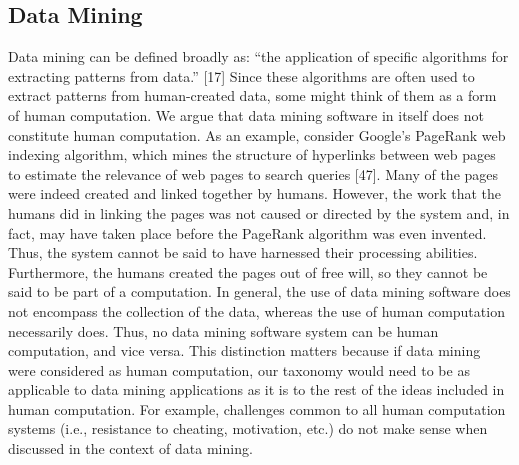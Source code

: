 \documentclass{sig-alternate}
\begin{document}
\subsection*{Data Mining}
Data mining can be defined broadly as:
“the application of specific algorithms for extracting patterns from data.” [17]
Since these algorithms are often used to extract patterns from human-created data, some might think of them as a form of human computation. We argue that data mining software in itself does not constitute human computation.
As an example, consider Google’s PageRank web indexing algorithm, which mines the structure of hyperlinks between web pages to estimate the relevance of web pages to search queries [47]. Many of the pages were indeed created and linked together by humans. However, the work that the humans did in linking the pages was not caused or directed by the system and, in fact, may have taken place before the PageRank algorithm was even invented. Thus, the system cannot be said to have harnessed their processing abilities. Furthermore, the humans created the pages out of free will, so they cannot be said to be part of a computation.
In general, the use of data mining software does not encompass the collection of the data, whereas the use of human computation necessarily does. Thus, no data mining software system can be human computation, and vice versa.
This distinction matters because if data mining were considered as human computation, our taxonomy would need to be as applicable to data mining applications as it is to the rest of the ideas included in human computation. For example, challenges common to all human computation systems (i.e., resistance to cheating, motivation, etc.) do not make sense when discussed in the context of data mining.
\end{document}
